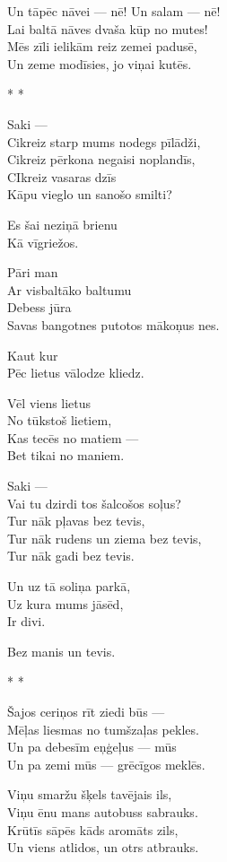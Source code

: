 \documentclass[14pt]{extarticle}
\begin{document}
Un tāpēc nāvei --- nē! Un salam --- nē!\\
Lai baltā nāves dvaša kūp no mutes!\\
Mēs zīli ielikām reiz zemei padusē,\\
Un zeme modīsies, jo viņai kutēs.


\newpage

{\large \sc * * *} 

Saki ---\\
Cikreiz starp mums nodegs pīlādži,\\
Cikreiz pērkona negaisi noplandīs,\\
CIkreiz vasaras dzīs\\
Kāpu vieglo un sanošo smilti?

Es šai neziņā brienu\\
Kā vīgriežos.

Pāri man\\
Ar visbaltāko baltumu\\
Debess jūra\\
Savas bangotnes putotos mākoņus nes.

Kaut kur\\
Pēc lietus vālodze kliedz.

Vēl viens lietus\\
No tūkstoš lietiem,\\
Kas tecēs no matiem ---\\
Bet tikai no maniem.

Saki ---\\
Vai tu dzirdi tos šalcošos soļus?\\
Tur nāk pļavas bez tevis,\\
Tur nāk rudens un ziema bez tevis,\\
Tur nāk gadi bez tevis.

Un uz tā soliņa parkā,\\
Uz kura mums jāsēd,\\
Ir divi.

Bez manis un tevis.




\newpage

{\large \sc * * *}

Šajos ceriņos rīt ziedi būs ---\\
Mēļas liesmas no tumšzaļas pekles.\\
Un pa debesīm eņģeļus --- mūs\\
Un pa zemi mūs --- grēcīgos meklēs.

Viņu smaržu šķels tavējais ils,\\
Viņu ēnu mans autobuss sabrauks.\\
Krūtīs sāpēs kāds aromāts zils,\\
Un viens atlidos, un otrs atbrauks.
\end{document}
